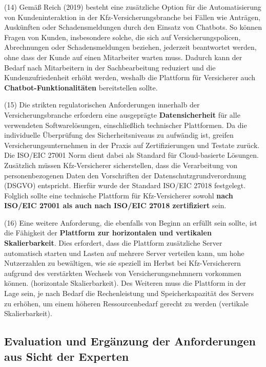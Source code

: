 (14) Gemäß Reich (2019) besteht eine zusätzliche Option für die Automatisierung von Kundeninteraktion in der Kfz-Versicherungsbranche bei Fällen wie Anträgen, Auskünften oder Schadensmeldungen durch den Einsatz von Chatbots. So können Fragen von Kunden, insbesondere solche, die sich auf Versicherungspolicen, Abrechnungen oder Schadensmeldungen beziehen, jederzeit beantwortet werden, ohne dass der Kunde auf einen Mitarbeiter warten muss. Dadurch kann der Bedarf nach Mitarbeitern in der Sachbearbeitung reduziert und die Kundenzufriedenheit erhöht werden, weshalb die Plattform für Versicherer auch \textbf{Chatbot-Funktionalitäten} bereitstellen sollte. \autocite[Vgl.][S. 300-302]{REICH2019}

(15) Die strikten regulatorischen Anforderungen innerhalb der Versicherungsbranche erfordern eine ausgeprägte \textbf{Datensicherheit} für alle verwendeten Softwarelösungen, einschließlich technischer Plattformen. Da die individuelle Überprüfung des Sicherheitsniveaus zu aufwändig ist, greifen Versicherungsunternehmen in der Praxis auf Zertifizierungen und Testate zurück. \autocite[Vgl.][S. 777]{ZDANOWIECKI2016} Die ISO/EIC 27001 Norm dient dabei als Standard für Cloud-basierte Lösungen. Zusätzlich müssen Kfz-Versicherer sicherstellen, dass die Verarbeitung von personenbezogenen Daten den Vorschriften der Datenschutzgrundverordnung (DSGVO) entspricht. Hierfür wurde der Standard ISO/EIC 27018 festgelegt. Folglich sollte eine technische Plattform für Kfz-Versicherer sowohl \textbf{nach ISO/EIC 27001 als auch nach ISO/EIC 27018 zertifiziert} sein. 

(16) Eine weitere Anforderung, die ebenfalls von Beginn an erfüllt sein sollte, ist die Fähigkeit der \textbf{Plattform zur horizontalen und vertikalen Skalierbarkeit}. Dies erfordert, dass die Plattform zusätzliche Server automatisch starten und Lasten auf mehrere Server verteilen kann, um hohe Nutzerzahlen zu bewältigen, wie sie speziell im Herbst bei Kfz-Versicherern aufgrund des verstärkten Wechsels von Versicherungsnehmnern vorkommen können. (horizontale Skalierbarkeit). Des Weiteren muss die Plattform in der Lage sein, je nach Bedarf die Rechenleistung und Speicherkapazität des Servers zu erhöhen, um einem höheren Ressourcenbedarf gerecht zu werden (vertikale Skalierbarkeit). \autocite[Vgl.][S. 23]{JAHNERT2020}

\subsection{Evaluation und Ergänzung der Anforderungen aus Sicht der Experten}

